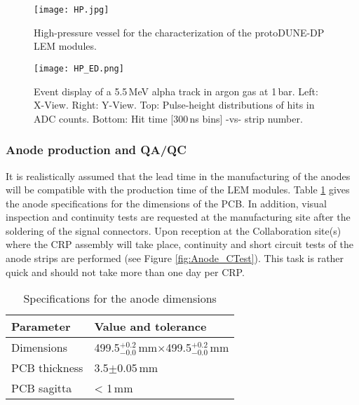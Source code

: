 \begin{figure}[h!]
  \centering
  \texttt{[image: HP.jpg]}
  \caption{High-pressure vessel for the characterization of the protoDUNE-DP LEM modules.}
  \label{fig:HP} 
\end{figure}

\begin{figure}[h!]
  \centering
 \texttt{[image: HP\_ED.png]}
  \caption{Event display of a 5.5\,MeV alpha track in argon gas at 1\,bar.  Left: X-View. Right: Y-View. Top: Pulse-height distributions of hits in ADC counts. Bottom: Hit time [300\,ns bins] -vs- strip number.}
     \label{fig:HP_ED} 
\end{figure}

\subsubsection{Anode production and QA/QC}
\label{sec:fddp-crp-ANODEprod}
It is realistically assumed that the lead time in the manufacturing of the anodes will be compatible with the production time
of the LEM modules. Table \ref{tab:ANODE_Tolerance} gives the anode specifications for the dimensions of the PCB. In addition, visual inspection and continuity tests are requested at the manufacturing site after the soldering of the signal connectors. Upon reception at the Collaboration site(s) where the CRP assembly will take place, continuity and short circuit tests of the anode strips are performed (see Figure \ref{fig:Anode_CTest}). This task is rather quick and should not take more than one day per CRP.  

\begin{table}[h!]
\begin{center}
\begin{tabular}{p{}p{}}
\hline
\hline
 Parameter & Value and tolerance\\
\hline
Dimensions & 499.5$^{+0.2}_{-0.0}$\,mm$\times$499.5$^{+0.2}_{-0.0}$\,mm \\
PCB thickness & 3.5$\pm$0.05\,mm \\
PCB sagitta & < 1\,mm \\
\hline
\hline
\end{tabular}
\caption{Specifications for the anode dimensions}
\label{tab:ANODE_Tolerance}
\end{center} 
\end{table} 

